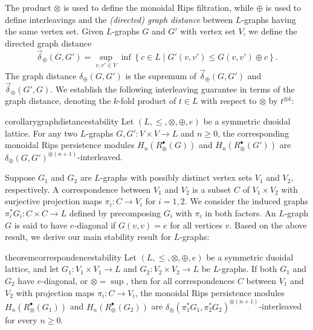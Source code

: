 \documentclass[a4paper,11pt]{article}
\newcommand{\tensor}{\otimes}
\newcommand{\atensor}{\oplus}
\theoremstyle{remark}
\begin{document}
The product $\tensor$ is used to define the monoidal Rips filtration, while $\atensor$ is used to define interleavings and the \emph{(directed) graph distance} between $L$-graphs having the same vertex set. Given $L$-graphs $G$ and $G'$ with vertex set $V$, we define the directed graph distance
\begin{equation*}
\vec{\delta}_\atensor(G,G')=\sup_{v,v'\in V}\inf\left\{c\in L\mid G'(v,v')\leq G(v,v')\atensor c\right\}.
\end{equation*}
The graph distance $\delta_\atensor(G,G')$ is the supremum of $\vec{\delta}_\atensor(G,G')$ and $\vec{\delta}_\atensor(G',G)$. We establish the following interleaving guarantee in terms of the graph distance, denoting the $k$-fold product of $t\in L$ with respect to $\tensor$ by $t^{\tensor k}$:
\begin{restatable*}{corollary}{graphdistancestability}
\label{cor:func_graph_distance_stability}
Let $(L,\leq,\tensor,\atensor,e)$ be a symmetric duoidal lattice. For any two $L$-graphs $G,G'\colon V\times V\to L$ and $n\geq 0$, the corresponding monoidal Rips persistence modules $H_n(R_\tensor^\bullet(G))$ and $H_n(R_\tensor^\bullet(G'))$ are $\delta_\atensor(G,G')^{\tensor (n+1)}$-interleaved.
\end{restatable*}

Suppose $G_1$ and $G_2$ are $L$-graphs with possibly distinct vertex sets $V_1$ and $V_2$, respectively. A correspondence between $V_1$ and $V_2$ is a subset $C$ of $V_1\times V_2$ with surjective projection maps $\pi_i\colon C\to V_i$ for $i=1,2$. We consider the induced graphs $\pi_i^*G_i\colon C\times C\to L$ defined by precomposing $G_i$ with $\pi_i$ in both factors. An $L$-graph $G$ is said to have $e$-diagonal if $G(v,v)=e$ for all vertices $v$. Based on the above result, we derive our main stability result for $L$-graphs:
\begin{restatable*}{theorem}{correspondencestability}
\label{thm:correspondence_stability}
Let $(L,\leq,\tensor,\atensor,e)$ be a symmetric duoidal lattice, and let $G_1\colon V_1\times V_1\to L$ and $G_2\colon V_2\times V_2\to L$ be $L$-graphs. If both $G_1$ and $G_2$ have $e$-diagonal, or $\tensor=\sup$, then for all correspondences $C$ between $V_1$ and $V_2$ with projection maps $\pi_i\colon C\to V_i$, the monoidal Rips persistence modules $H_n(R_\tensor^\bullet(G_1))$ and $H_n(R_\tensor^\bullet(G_2))$ are $\delta_\atensor(\pi_1^*G_1,\pi_2^*G_2)^{\tensor (n+1)}$-interleaved for every $n\geq0$.
\end{restatable*}
\end{document}
